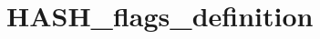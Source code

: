 \hypertarget{group___h_a_s_h__flags__definition}{\section{H\-A\-S\-H\-\_\-flags\-\_\-definition}
\label{group___h_a_s_h__flags__definition}
}
